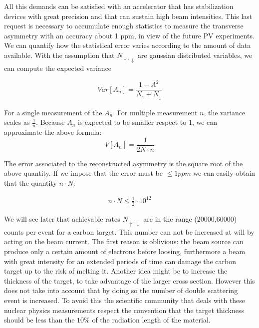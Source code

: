 All this demands can be satisfied with an accelerator that has stabilization devices with great precision and that can sustain high beam intensities. This last request is necessary to accumulate enough statistics to measure the transverse asymmetry with an accuracy about 1 ppm, in view of the future PV experiments. We can quantify how the statistical error varies according to the amount of data available. With the assumption that $N_{\uparrow,\downarrow}$ are gaussian distributed variables, we can compute the expected variance

\begin{equation}
Var[A_{n}] = \dfrac{1 - A^{2}}{N_{\uparrow} + N_{\downarrow}} 
\end{equation}

For a single measurement of the $A_{n}$. For multiple measurement $n$, the variance scales as $\frac{1}{n}$.
Because $A_{n}$ is expected to be smaller respect to 1, we can approximate the above formula:
\begin{equation} 
V[A_{n}] = \dfrac{1}{2N \cdot n}  \label{eq:Error}
\end{equation}

The error associated to the reconstructed asymmetry is the square root of the above quantity. If we impose that the error must be $\le 1ppm$ we can easily obtain that the quantity $n\cdot N$:

\begin{align*}
n\cdot N \le \frac{1}{2} \cdot 10^{12}
\end{align*} 

We will see later that achievable rates $N_{\uparrow,\downarrow}$ are in the range (20000,60000) counts per event for a carbon target. This number can not be increased at will by acting on the beam current. The first reason is oblivious: the beam source can produce only a certain amount of electrons before loosing, furthermore a beam with great intensity for an extended periods of time can damage the carbon target up to the risk of melting it. 
Another idea might be to increase the thickness of the target, to take advantage of the larger cross section. However this does not take into account that by doing so the number of double scattering event is increased. To avoid this the scientific community that deals with these nuclear physics measurements respect the convention that the target thickness should be less than the $10 \%$ of the radiation length of the material.
